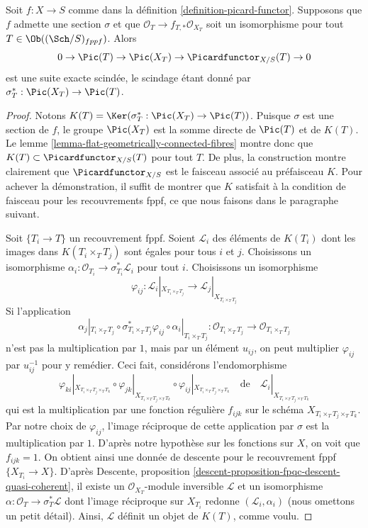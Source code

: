 \begin{lemma}
\label{lemma-flat-geometrically-connected-fibres-with-section}
Soit $f : X \to S$ comme dans la définition \ref{definition-picard-functor}.
Supposons que $f$ admette une section $\sigma$ et que
$\mathcal{O}_T \to f_{T, *}\mathcal{O}_{X_T}$ soit un isomorphisme
pour tout $T \in \Ob((\Sch/S)_{fppf})$. Alors
$$
0 \to \Pic(T) \to \Pic(X_T) \to \Picardfunctor_{X/S}(T) \to 0
$$
est une suite exacte scindée, le scindage étant donné par
$\sigma_T^* : \Pic(X_T) \to \Pic(T)$.
\end{lemma}

\begin{proof}
Notons $K(T) = \Ker(\sigma_T^* : \Pic(X_T) \to \Pic(T))$.
Puisque $\sigma$ est une section de $f$, le groupe $\Pic(X_T)$ est la somme
directe de $\Pic(T)$ et de $K(T)$.
Le lemme \ref{lemma-flat-geometrically-connected-fibres} montre donc que
$K(T) \subset \Picardfunctor_{X/S}(T)$ pour tout $T$. De plus, la construction
montre clairement que $\Picardfunctor_{X/S}$ est le faisceau associé
au préfaisceau $K$. Pour achever la démonstration, il suffit de montrer que
$K$ satisfait à la condition de faisceau pour les recouvrements fppf, ce que nous faisons
dans le paragraphe suivant.

\medskip\noindent
Soit $\{T_i \to T\}$ un recouvrement fppf. Soient $\mathcal{L}_i$ des
éléments de $K(T_i)$ dont les images dans $K(T_i \times_T T_j)$ sont égales
pour tous $i$ et $j$. Choisissons un isomorphisme
$\alpha_i : \mathcal{O}_{T_i} \to \sigma_{T_i}^*\mathcal{L}_i$
pour tout $i$. Choisissons un isomorphisme
$$
\varphi_{ij} :
\mathcal{L}_i|_{X_{T_i \times_T T_j}}
\longrightarrow
\mathcal{L}_j|_{X_{T_i \times_T T_j}}
$$
Si l'application
$$
\alpha_j|_{T_i \times_T T_j} \circ
\sigma_{T_i \times_T T_j}^*\varphi_{ij} \circ
\alpha_i|_{T_i \times_T T_j} :
\mathcal{O}_{T_i \times_T T_j} \to \mathcal{O}_{T_i \times_T T_j}
$$
n'est pas la multiplication par $1$, mais par un élément $u_{ij}$, on peut multiplier
$\varphi_{ij}$ par $u_{ij}^{-1}$ pour y remédier. Ceci fait, considérons
l'endomorphisme
$$
\varphi_{ki}|_{X_{T_i \times_T T_j \times_T T_k}} \circ
\varphi_{jk}|_{X_{T_i \times_T T_j \times_T T_k}} \circ
\varphi_{ij}|_{X_{T_i \times_T T_j \times_T T_k}}
\quad\text{de}\quad
\mathcal{L}_i|_{X_{T_i \times_T T_j \times_T T_k}}
$$
qui est la multiplication par une fonction régulière $f_{ijk}$
sur le schéma $X_{T_i \times_T T_j \times_T T_k}$.
Par notre choix de $\varphi_{ij}$, l'image réciproque de
cette application par $\sigma$ est la multiplication par $1$. D'après
notre hypothèse sur les fonctions sur $X$, on voit que $f_{ijk} = 1$.
On obtient ainsi une donnée de descente pour le recouvrement fppf
$\{X_{T_i} \to X\}$. D'après
Descente, proposition \ref{descent-proposition-fpqc-descent-quasi-coherent},
il existe un $\mathcal{O}_{X_T}$-module inversible $\mathcal{L}$
et un isomorphisme $\alpha : \mathcal{O}_T \to \sigma_T^*\mathcal{L}$
dont l'image réciproque sur $X_{T_i}$ redonne $(\mathcal{L}_i, \alpha_i)$
(nous omettons un petit détail). Ainsi, $\mathcal{L}$ définit un objet
de $K(T)$, comme voulu.
\end{proof}



